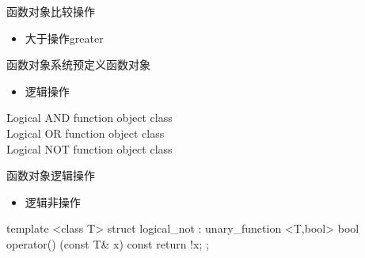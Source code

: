 \begin{frame}[t, fragile]{函数对象}{比较操作}
  \begin{itemize}
  \item 大于操作greater
  \end{itemize}
  \begin{center}
  \end{center}
\end{frame}

\begin{frame}[t, fragile]{函数对象}{系统预定义函数对象}
  \begin{itemize}
  \item 逻辑操作
  \end{itemize}
  \begin{tabbing}
     \hspace{3em} \= Logical AND function object class\\
     \> Logical OR function object class\\
     \> Logical NOT function object class
  \end{tabbing}
\end{frame}

\begin{frame}[t, fragile]{函数对象}{逻辑操作}%
  \begin{itemize}
  \item 逻辑非操作
  \end{itemize}
  \begin{center}
    \begin{minipage}[t]{0.45\linewidth}
      \begin{cppttnobg}
template <class T>
struct logical_not : unary_function <T,bool>
{
  bool operator() (const T& x) const
  {
    return !x;
  }
};
      \end{cppttnobg}
    \end{minipage}
  \end{center}
\end{frame}

